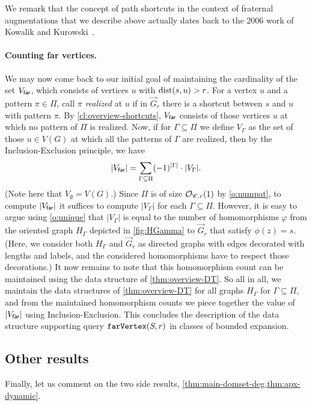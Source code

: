 We remark that the concept of path shortcuts in the context of fraternal augmentations that we describe above actually dates back to the 2006 work of Kowalik and Kurowski~\cite{KowalikK06}.

\paragraph*{Counting far vertices.} We may now come back to our initial goal of maintaining the cardinality of the set $V_{\mathsf{far}}$, which consists of vertices $u$ with $\mathrm{dist}(s,u)>r$. For a vertex $u$ and a pattern $\pi\in \Pi$, call $\pi$ \emph{realized} at $u$ if in $\vec G_r$ there is a shortcut between $s$ and $u$ with pattern $\pi$. By \cref{cl:overview-shortcuts}, $V_{\mathsf{far}}$ consists of those vertices $u$ at which no pattern of $\Pi$ is realized. Now, if for $\Gamma\subseteq \Pi$ we define $V_\Gamma$ as the set of those $u\in V(G)$ at which all the patterns of $\Gamma$ are realized, then by the Inclusion-Exclusion principle, we have
\[|V_{\mathsf{far}}|=\sum_{\Gamma\subseteq \Pi} (-1)^{|\Gamma|}\cdot |V_\Gamma|.\]
(Note here that $V_\emptyset=V(G)$.) Since $\Pi$ is of size $\mathcal{O}_{\mathscr C,r}(1)$ by \ref{o:numpat}, to compute $|V_{\mathsf{far}}|$ it suffices to compute $|V_\Gamma|$ for each $\Gamma\subseteq \Pi$. However, it is easy to argue using \ref{o:unique} that $|V_\Gamma|$ is equal to the number of homomorphisms $\varphi$ from the oriented graph $H_\Gamma$ depicted in \cref{fig:HGamma} to $\vec G_r$ that satisfy $\phi(z)=s$. (Here, we consider both $H_\Gamma$ and $\vec G_r$ as directed graphs with edges decorated with lengths and labels, and the considered homomorphisms have to respect those decorations.) It now remains to note that this homomorphism count can be maintained using the data structure of \cref{thm:overview-DT}. So all in all, we maintain the data structures of \cref{thm:overview-DT} for all graphs $H_\Gamma$ for $\Gamma\subseteq \Pi$, and from the maintained homomorphism counts we piece together the value of $|V_{\mathsf{far}}|$ using Inclusion-Exclusion. This concludes the description of the data structure supporting query $\mathtt{farVertex}(S,r)$ in classes of bounded expansion.




\subsection{Other results}\label{sec:overview-other}

Finally, let us comment on the two side results, \cref{thm:main-domset-deg,thm:apx-dynamic}.

